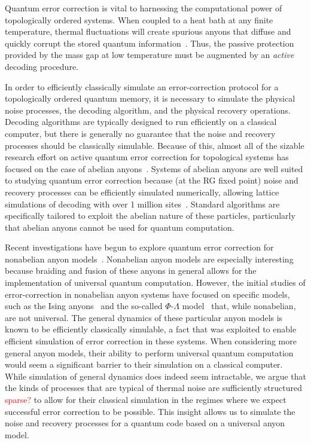 \documentclass[aps, prl, letterpaper, twocolumn, superscriptaddress, notitlepage, 10pt]{revtex4-1}
\newcommand{\dude}[1]{\textcolor{red}{#1}}
\begin{document}
Quantum error correction is vital to harnessing the computational power of topologically 
ordered systems. When coupled to a heat bath at any finite temperature, thermal fluctuations 
will create spurious anyons that diffuse and quickly corrupt the stored quantum 
information~\cite{Pastawski2010}. Thus, the passive protection provided by the mass gap 
at low temperature must be augmented by an \emph{active} decoding procedure. 

In order to efficiently classically simulate an error-correction protocol for 
a topologically ordered quantum memory, it is necessary to simulate 
the physical noise processes, the decoding algorithm, and the physical recovery operations. 
Decoding algorithms are typically designed to run efficiently on a 
classical computer, but there is generally no guarantee that the 
noise and recovery processes should be classically simulable.
Because of this, almost all of the sizable research effort 
on active quantum error correction for topological systems has focused 
on the case of abelian anyons~\cite{Dennis2002, Duclos-Cianci2010, Duclos-Cianci2010a, Wang2010, Wang2010a, Duclos-Cianci2013, Bravyi2011, Bombin2012, Wootton2012, Anwar2014, Watson2014, Hutter2014a, Bravyi2014, Wootton2015, Fowler2015, Andrist2015}.
Systems of abelian anyons are well suited to studying quantum 
error correction because (at the RG fixed point) noise and 
recovery processes can be efficiently simulated numerically, allowing lattice simulations 
of decoding with over 1 million sites~\cite{Duclos-Cianci2010}. 
Standard algorithms are specifically tailored to exploit the abelian nature 
of these particles, particularly that abelian anyons cannot be used for quantum computation. 

Recent investigations have begun to explore quantum error correction for nonabelian anyon 
models~\cite{Brell2013, Wootton2013, Hutter2014, Wootton2015b}. Nonabelian anyon models are especially interesting 
because braiding and fusion of these anyons in general allows for the implementation of universal quantum 
computation. However, the initial studies of error-correction in nonabelian anyon systems have focused on specific models, such as the Ising 
anyons~\cite{Brell2013} and the so-called $\Phi$-$\Lambda$ 
model~\cite{Wootton2013, Hutter2014} that, while nonabelian, are not universal. The general dynamics of these particular anyon models is known to be efficiently classically simulable, a fact
that was exploited to enable efficient simulation of error correction 
in these systems. When considering more general anyon models, their 
ability to perform universal quantum computation would seem a significant 
barrier to their simulation on a classical computer. While simulation 
of general dynamics does indeed seem intractable, we argue that 
the kinds of processes that are typical of thermal noise 
are sufficiently structured  \dude{sparse?} to allow for their classical simulation 
in the regimes where we expect successful error correction to 
be possible. This insight allows us to simulate the noise 
and recovery processes for a quantum code based on a universal anyon model.
\end{document}
